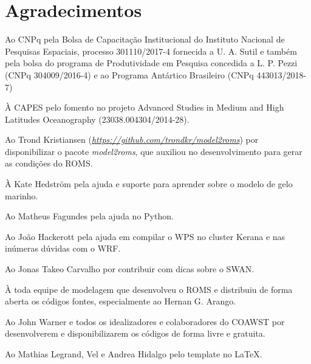 \chapter*{Agradecimentos}

\bigskip


\noindent Ao CNPq pela Bolsa de Capacitação Institucional do Instituto Nacional de Pesquisas Espaciais, processo 301110/2017-4 
          fornecida a U. A. Sutil e também pela bolsa do programa de Produtividade em Pesquisa concedida a
          L. P. Pezzi (CNPq 304009/2016-4) e ao Programa Antártico Brasileiro (CNPq 443013/2018-7) 
\bigskip

\noindent À CAPES pelo fomento no projeto Advanced Studies in Medium and High Latitudes Oceanography (23038.004304/2014-28). 
\bigskip

\noindent Ao Trond Kristiansen (\textcolor{bleu_cite}{\textit{\href{https://github.com/trondkr/model2roms}{https://github.com/trondkr/model2roms}}}) por disponibilizar o 
          pacote \textit{model2roms}, que auxiliou no desenvolvimento para gerar as condições do ROMS. 
\bigskip

\noindent À Kate Hedström pela ajuda e suporte para aprender sobre o modelo de gelo marinho.
\bigskip

\noindent Ao Matheus Fagundes pela ajuda no Python. 
\bigskip

\noindent Ao João Hackerott pela ajuda em compilar o WPS no cluster Kerana e nas inúmeras dúvidas com o WRF.
\bigskip

\noindent Ao Jonas Takeo Carvalho por contribuir com dicas sobre o SWAN. 
\bigskip

\noindent À toda equipe de modelagem que desenvolveu o ROMS e distribuiu de forma aberta os códigos fontes, 
          especialmente ao Hernan G. Arango.
\bigskip

\noindent Ao John Warner e todos os idealizadores e colaboradores do COAWST por desenvolverem e disponibilizarem os códigos de forma livre e gratuita.
\bigskip

\noindent Ao Mathias Legrand, Vel e Andrea Hidalgo pelo template no \LaTeX.
\bigskip